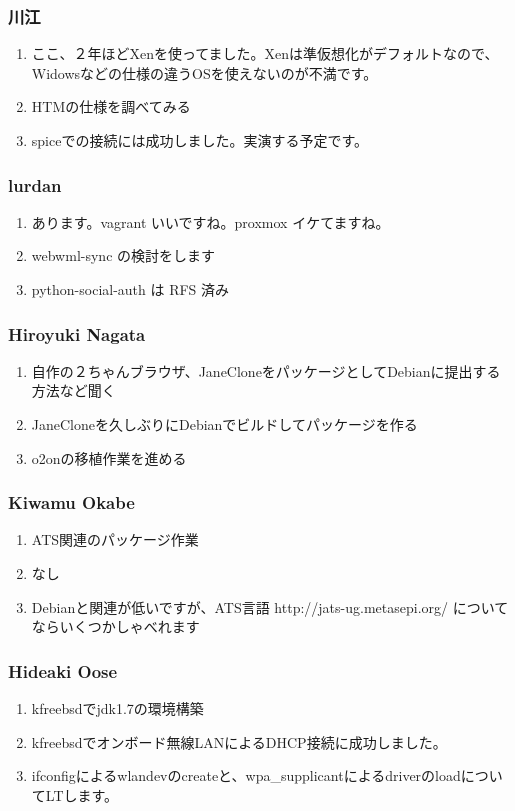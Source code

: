\documentclass[cjk,dvipdfmx,10pt,compress,%
hyperref={bookmarks=true,bookmarksnumbered=true,bookmarksopen=false,%
colorlinks=false,%
pdftitle={第 82 回 関西 Debian 勉強会},%
pdfauthor={倉敷・のがた・佐々木・かわだ・八津尾},%
pdfsubject={資料},%
}]{beamer}
\begin{document}
\begin{frame}
  \frametitle{ 川江 }
  \begin{enumerate}
  \item ここ、２年ほどXenを使ってました。Xenは準仮想化がデフォルトなので、Widowsなどの仕様の違うOSを使えないのが不満です。
  \item HTMの仕様を調べてみる
  \item spiceでの接続には成功しました。実演する予定です。
  \end{enumerate}
\end{frame}

\begin{frame}
  \frametitle{ lurdan }
  \begin{enumerate}
  \item あります。vagrant いいですね。proxmox イケてますね。
  \item webwml-sync の検討をします
  \item python-social-auth は RFS 済み
  \end{enumerate}
\end{frame}

\begin{frame}
  \frametitle{ Hiroyuki Nagata }
  \begin{enumerate}
  \item 自作の２ちゃんブラウザ、JaneCloneをパッケージとしてDebianに提出する方法など聞く
  \item JaneCloneを久しぶりにDebianでビルドしてパッケージを作る
  \item o2onの移植作業を進める
  \end{enumerate}
\end{frame}

\begin{frame}
  \frametitle{ Kiwamu Okabe }
  \begin{enumerate}
  \item ATS関連のパッケージ作業
  \item なし
  \item Debianと関連が低いですが、ATS言語 http://jats-ug.metasepi.org/ についてならいくつかしゃべれます
  \end{enumerate}
\end{frame}

\begin{frame}
  \frametitle{ Hideaki Oose }
  \begin{enumerate}
  \item kfreebsdでjdk1.7の環境構築
  \item kfreebsdでオンボード無線LANによるDHCP接続に成功しました。
  \item ifconfigによるwlandevのcreateと、wpa\_supplicantによるdriverのloadについてLTします。
  \end{enumerate}
\end{frame}
\end{document}
